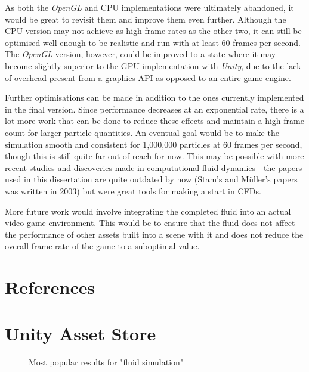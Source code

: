 \documentclass[a4paper, 12pt]{article}
\newcommand{\wideimage}[2][]{%
  \makebox[\textwidth][c]{\texttt{[image: \#2]}}%
}
\begin{document}
    As both the \textit{OpenGL} and CPU implementations were ultimately abandoned, it would be great to revisit them and improve them even further. Although the CPU version may not achieve as high frame rates as the other two, it can still be optimised well enough to be realistic and run with at least 60 frames per second. The \textit{OpenGL} version, however, could be improved to a state where it may become slightly superior to the GPU implementation with \textit{Unity}, due to the lack of overhead present from a graphics API as opposed to an entire game engine.

    Further optimisations can be made in addition to the ones currently implemented in the final version. Since performance decreases at an exponential rate, there is a lot more work that can be done to reduce these effects and maintain a high frame count for larger particle quantities. An eventual goal would be to make the simulation smooth and consistent for 1,000,000 particles at 60 frames per second, though this is still quite far out of reach for now. This may be possible with more recent studies and discoveries made in computational fluid dynamics - the papers used in this dissertation are quite outdated by now (Stam's  and Müller's papers was written in 2003) but were great tools for making a start in CFDs.

    More future work would involve integrating the completed fluid into an actual video game environment. This would be to ensure that the fluid does not affect the performance of other assets built into a scene with it and does not reduce the overall frame rate of the game to a suboptimal value.

    \newpage

    \section{References}
    \label{sec:references}
    

    \newpage

    \appendix
    \label{sec:appendices}

    \section{Unity Asset Store}

    \begin{figure}[H]
        \wideimage[width=1.4\textwidth]{unityStore1.png}
        \caption{Most popular results for "fluid simulation" \cite{unityasset}}
    \end{figure}
\end{document}
